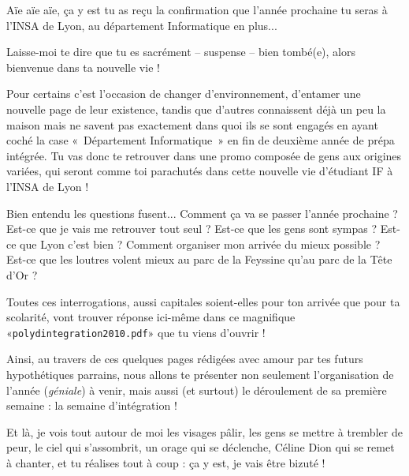 Aïe aïe aïe, ça y est tu as reçu la confirmation que l'année prochaine tu seras à l'INSA de Lyon, au département Informatique en plus...

\vspace{1em}

Laisse-moi te dire que tu es sacrément -- suspense -- bien tombé(e), alors
bienvenue dans ta nouvelle vie !


\vspace{1em}

Pour certains c'est l'occasion de changer d'environnement, d'entamer une
nouvelle page de leur existence, tandis que d'autres connaissent déjà un peu la maison mais
ne savent pas exactement dans quoi ils se sont engagés en ayant coché la case «~Département
Informatique~» en fin de deuxième année de prépa intégrée. Tu vas donc te retrouver dans
une promo composée de gens aux origines variées, qui seront comme toi parachutés
dans cette nouvelle vie d'étudiant IF à l'INSA de Lyon !


\vspace{1em}

Bien entendu les questions fusent... Comment ça va se passer l'année
prochaine ? Est-ce que je vais me retrouver tout seul ?  Est-ce que les gens
sont sympas ? Est-ce que  Lyon c'est bien ? Comment organiser mon arrivée du
mieux possible ? Est-ce que les loutres volent mieux au parc de la Feyssine
qu'au parc de la Tête d'Or ?


\vspace{1em}

Toutes ces interrogations, aussi capitales soient-elles pour ton arrivée que pour ta
scolarité, vont trouver réponse ici-même dans ce magnifique
«\texttt{polydintegration2010.pdf}» que tu viens d'ouvrir !


\vspace{1em}

Ainsi, au travers de ces quelques pages rédigées avec amour par tes futurs
hypothétiques parrains, nous allons te présenter non seulement l'organisation
de l'année (\emph{géniale}) à venir, mais aussi (et surtout) le déroulement de sa première
semaine : la semaine d'intégration !


\vspace{1em}

Et là, je vois tout autour de moi les visages pâlir, les gens se mettre à
trembler de peur, le ciel qui s'assombrit, un orage qui se
déclenche, Céline Dion qui se remet à chanter, et tu réalises tout à coup : ça y est,
je vais être bizuté !


